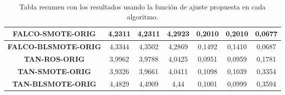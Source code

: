 \begin{table}[H]
{\begin{tabular}{|ccccccc|}
\multicolumn{1}{|c|}{\textbf{FALCO-SMOTE-ORIG}}   & \multicolumn{1}{c|}{4,2311}           & \multicolumn{1}{c|}{4,2311}             & \multicolumn{1}{c|}{4,2923}       & \multicolumn{1}{c|}{0,2010}           & \multicolumn{1}{c|}{0,2010}             & 0,0677        \\ \hline
\multicolumn{1}{|c|}{\textbf{FALCO-BLSMOTE-ORIG}} & \multicolumn{1}{c|}{4,3344}           & \multicolumn{1}{c|}{4,3502}             & \multicolumn{1}{c|}{4,2869}       & \multicolumn{1}{c|}{0,1492}           & \multicolumn{1}{c|}{0,1410}             & 0,0687       \\ \hline
\multicolumn{1}{|c|}{\textbf{TAN-ROS-ORIG}}       & \multicolumn{1}{c|}{3,9962}           & \multicolumn{1}{c|}{3,9788}             & \multicolumn{1}{c|}{4,0425}       & \multicolumn{1}{c|}{0,0951}            & \multicolumn{1}{c|}{0,0959}              & 0,1781       \\ \hline
\multicolumn{1}{|c|}{\textbf{TAN-SMOTE-ORIG}}     & \multicolumn{1}{c|}{3,9326}           & \multicolumn{1}{c|}{3,9661}             & \multicolumn{1}{c|}{4,0411}       & \multicolumn{1}{c|}{0,1098}            & \multicolumn{1}{c|}{0,1039}             & 0,3354       \\ \hline
\multicolumn{1}{|c|}{\textbf{TAN-BLSMOTE-ORIG}}   & \multicolumn{1}{c|}{4,4829}           & \multicolumn{1}{c|}{4,4909}             & \multicolumn{1}{c|}{4,44}          & \multicolumn{1}{c|}{0,1001}            & \multicolumn{1}{c|}{0,0999}             & 0,3594        \\ \hline
\end{tabular}%
}
\caption{Tabla resumen con los resultados usando la función de ajuste propuesta en cada algoritmo.}\label{resumenDEFECTO}
\end{table}



